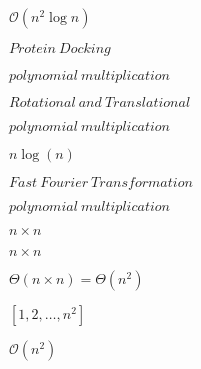\documentclass[10pt]{book}
\begin{document}
\begin{mdSnippets}
\begin{mdInlineSnippet}[9d528e438fd00b69e5f1d9b8b3d422ed]
$\mathcal{O}(n^2 \log n)$\end{mdInlineSnippet}%
\begin{mdInlineSnippet}[fcd670dd067c0f0fc707963f8d460230]%
$Protein~Docking$\end{mdInlineSnippet}%
\begin{mdInlineSnippet}[ce83b53b35fbc42c80c3f1d83fa796cb]%
$polynomial~multiplication$\end{mdInlineSnippet}%
\begin{mdInlineSnippet}%
$Rotational~and~Translational$\end{mdInlineSnippet}%
\begin{mdInlineSnippet}[ce83b53b35fbc42c80c3f1d83fa796cb]%
$polynomial~multiplication$\end{mdInlineSnippet}%
\begin{mdInlineSnippet}[b29a8d8b4b162b9fb3aff3db179d8562]%
$n \log(n)$\end{mdInlineSnippet}%
\begin{mdInlineSnippet}%
$Fast~Fourier~Transformation$\end{mdInlineSnippet}%
\begin{mdInlineSnippet}[ce83b53b35fbc42c80c3f1d83fa796cb]%
$polynomial~multiplication$\end{mdInlineSnippet}%
\begin{mdInlineSnippet}[50f17e5c11d610b19c0471830dc4dda1]%
$n \times n$\end{mdInlineSnippet}%
\begin{mdInlineSnippet}[50f17e5c11d610b19c0471830dc4dda1]%
$n \times n$\end{mdInlineSnippet}%
\begin{mdInlineSnippet}[b3d88fc0e53c047bd3c59399084257a2]%
$\Theta(n \times n) = \Theta(n^2)$\end{mdInlineSnippet}%
\begin{mdInlineSnippet}%
$[1, 2, \dots, n^2]$\end{mdInlineSnippet}%
\begin{mdInlineSnippet}%
$\mathcal{O}(n ^2)$\end{mdInlineSnippet}%

\end{mdSnippets}
\end{document}
